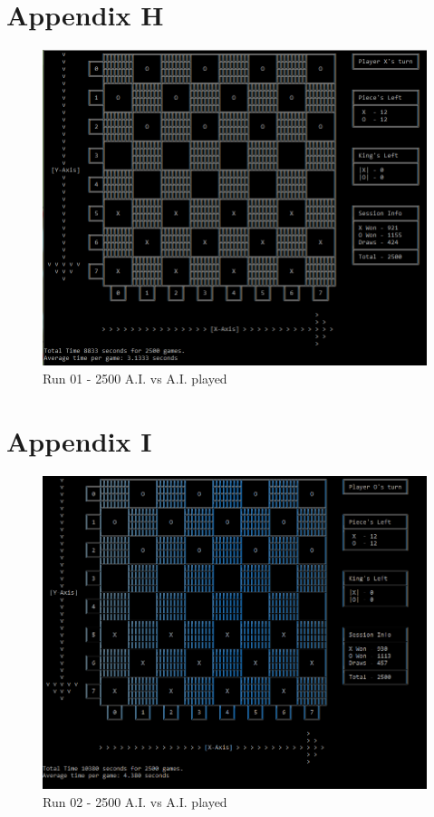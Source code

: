 \documentclass[10pt, a4paper]{article}
\begin{document}
 \section{Appendix H}
  \label{appendix:h}
 \begin{figure}[H]
 	\centering	
 	\includegraphics[scale=0.8]{RunOne2500}
 	\caption{Run 01 - 2500 A.I. vs A.I. played}		
 \end{figure}
 \newpage
 \section{Appendix I}
  \label{appendix:i}
 \begin{figure}[H]
 	\centering
 	\includegraphics[scale=0.8]{RunTwo2500}
 	\caption{Run 02 - 2500 A.I. vs A.I. played}
 \end{figure}   
\end{document}
